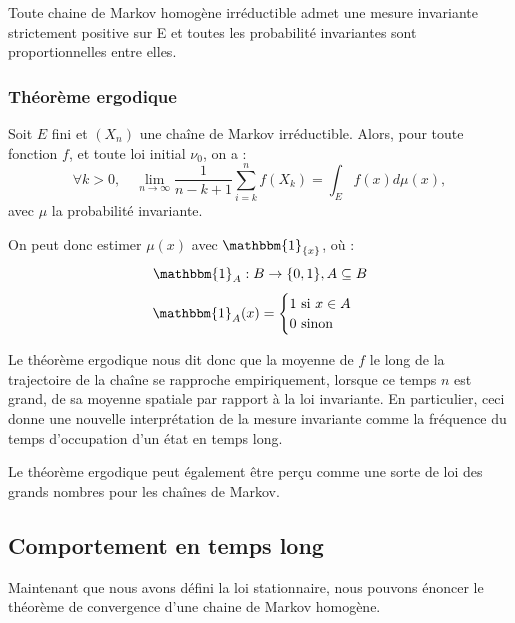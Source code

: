 \documentclass{article}
\begin{document}
\begin{tcolorbox}[colback=white,colframe=blue!80!black,title=Probabilité invariante d'une chaîne de Markov irréductible]
Toute chaine de Markov homogène irréductible admet une mesure invariante strictement positive sur E et toutes les probabilité invariantes sont proportionnelles entre elles.
\end{tcolorbox}

\subsubsection{Théorème ergodique}

\begin{tcolorbox}[colback=white,colframe=red!80!black,title=Théorème ergodique (admis)]

Soit $E$ fini et $(X_n)$ une chaîne de Markov irréductible.
Alors, pour toute fonction $f$, et toute loi initial $\nu_0$, on a :
\[
\forall k > 0, \quad \lim_{n \to \infty}{ \frac{1}{n-k+1}\sum_{i=k}^{n}{f(X_k)} } = \int_{E} f(x) d{\mu(x)},
\]
avec $\mu$ la probabilité invariante.

\end{tcolorbox}

On peut donc estimer $\mu(x)$ avec $\mathbbm{1}_{\{x\}} $, où :
\[
    \mathbbm{1}_{A} : B \to \{0,1\}, A \subseteq B
\]
\[
    \mathbbm{1}_{A}(x) = \begin{cases}
        1 \text{ si } x \in A \\
        0 \text{ sinon} 
    \end{cases}
\]

Le théorème ergodique nous dit donc que la moyenne de $f$ le long de la trajectoire de la chaîne se rapproche empiriquement,
lorsque ce temps $n$ est grand, de sa moyenne spatiale par rapport à la loi invariante. En particulier, 
ceci donne une nouvelle interprétation de la mesure invariante comme la fréquence du temps d'occupation d'un état en temps long.

Le théorème ergodique peut également être perçu comme une sorte de loi des grands nombres pour les chaînes de Markov.

\newpage %
\subsection{Comportement en temps long}

Maintenant que nous avons défini la loi stationnaire, nous pouvons énoncer le théorème de convergence d'une chaine de Markov homogène. \\
\end{document}
